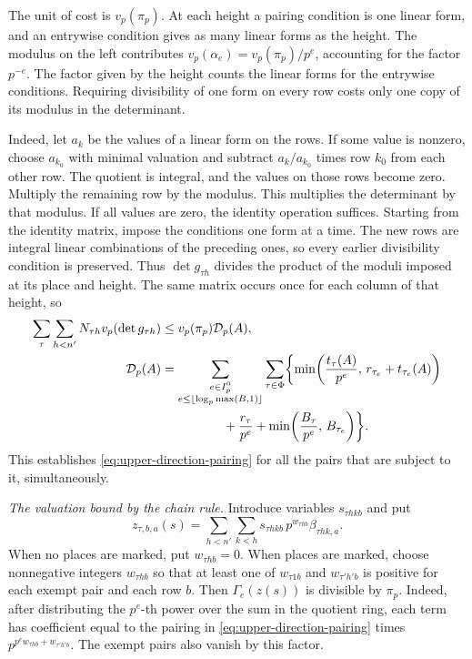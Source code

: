 The unit of cost is \(v_p(\pi_p)\). At each height a pairing condition
is one linear form, and an entrywise condition gives as many linear
forms as the height. The modulus on the left contributes
\(v_p(\alpha_e)=v_p(\pi_p)/p^e\), accounting for the factor \(p^{-e}\).
The factor given by the height counts the linear forms for the
entrywise conditions. Requiring divisibility of one form on every
row costs only one copy of its modulus in the determinant.

Indeed, let \(a_k\) be the values of a linear form on the rows.
If some value is nonzero, choose \(a_{k_0}\) with minimal valuation
and subtract \(a_k/a_{k_0}\) times row \(k_0\) from each other row.
The quotient is integral, and the values on those rows become zero.
Multiply the remaining row by the modulus. This multiplies the
determinant by that modulus. If all values are zero, the identity
operation suffices. Starting from the identity matrix, impose the
conditions one form at a time. The new rows are integral linear
combinations of the preceding ones, so every earlier divisibility
condition is preserved. Thus \(\det g_{\tau h}\) divides the product
of the moduli imposed at its place and height. The same matrix occurs
once for each column of that height, so
\[
 \begin{aligned}
  \sum_{\tau}\sum_{h<n'}N_{\tau h}v_p(\det g_{\tau h})
   &\le v_p(\pi_p)\mathcal D_p(A),\\
  \mathcal D_p(A)
   &=\sum_{\substack{e\in I_p^0\\e\le\lfloor\log_p\max(B,1)\rfloor}}
       \sum_{\tau\in\Phi}
       \biggl\{\min\!\left(\frac{t_\tau(A)}{p^e},\,r_{\tau_e}+t_{\tau_e}(A)\right)\\
   &\hphantom{=\sum_e\sum_\tau\biggl\{}{}
          +\frac{r_\tau}{p^e}
          +\min\!\left(\frac{B_\tau}{p^e},\,B_{\tau_e}\right)\biggr\}.
 \end{aligned}
\]
This establishes \eqref{eq:upper-direction-pairing} for all the pairs
that are subject to it, simultaneously.

\emph{The valuation bound by the chain rule.}
Introduce variables \(s_{\tau h k b}\) and put
\[
 z_{\tau,b,a}(s)=\sum_{h<n'}\sum_{k<h}s_{\tau h k b}\,p^{w_{\tau h b}}\beta_{\tau h k,a}.
\]
When no places are marked, put \(w_{\tau h b}=0\).
When places are marked, choose nonnegative integers \(w_{\tau h b}\)
so that at least one of \(w_{\tau 1 b}\) and \(w_{\tau' h' b}\) is
positive for each exempt pair and each row \(b\).
Then \(\Gamma_e(z(s))\) is divisible by \(\pi_p\). Indeed, after
distributing the \(p^e\)-th power over the sum in the quotient ring,
each term has coefficient equal to the pairing in
\eqref{eq:upper-direction-pairing} times
\(p^{p^e w_{\tau h b}+w_{\tau' h' b}}\).
The exempt pairs also vanish by this factor.

